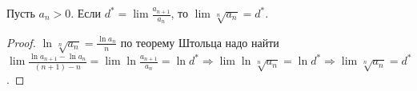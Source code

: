 \begin{theorem}
    Пусть $a_n>0$. Если $d^*=\lim\frac{a_{n+1}}{a_n}$, то $\lim\sqrt[n]{a_n}=d^*$.
\end{theorem}

\begin{proof}
    $\ln \sqrt[n]{a_n}=\frac{\ln a_n}{n}$ по теорему Штольца надо найти $\lim\frac{\ln a_{n+1}-\ln a_n}{(n+1)-n}=\lim \ln\frac{a_{n+1}}{a_n}=\ln d^*\Rightarrow \lim \ln \sqrt[n]{a_n}=\ln d^*\Rightarrow \lim\sqrt[n]{a_n}=d^*$.
\end{proof}

